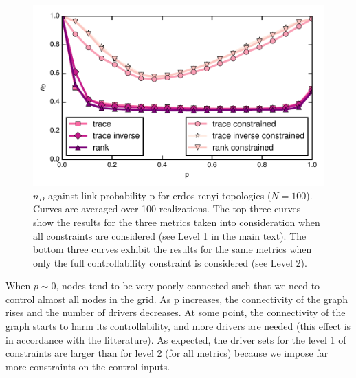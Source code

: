 \documentclass[conference]{IEEEtran}
\begin{document}
\begin{figure}
\includegraphics[scale=.55]{plot3.pdf}%
\caption{ $ n_D $ against link probability p for erdos-renyi topologies ($ N=100 $). Curves are averaged over 100 realizations. The top three curves show the results for the three metrics taken into consideration when all constraints are considered (see Level 1 in the main text). The bottom three curves exhibit the results for the same metrics when only the full controllability constraint is considered (see Level 2).}
\label{fig:erdos_renyi}
\end{figure}


When $p \sim 0$, nodes tend to be very poorly connected such that we need to control almost all nodes in the grid. As p increases, the connectivity of the graph rises and the number of drivers decreases. At some point, the connectivity of the graph starts to harm its controllability, and more drivers are needed (this effect is in accordance with the litterature). As expected, the driver sets for the level 1 of constraints are larger than for level 2 (for all metrics) because we impose far more constraints on the control inputs.
\end{document}

